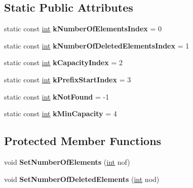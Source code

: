 \subsection*{Static Public Attributes}
\begin{DoxyCompactItemize}
\item 
\mbox{\label{classv8_1_1internal_1_1HashTableBase_aec11b4e6518d8551f973bc237740cc89}} 
static const \mbox{\hyperlink{classint}{int}} {\bfseries k\+Number\+Of\+Elements\+Index} = 0
\item 
\mbox{\label{classv8_1_1internal_1_1HashTableBase_aac8547f563526b42fd0be66a3d6cdd9e}} 
static const \mbox{\hyperlink{classint}{int}} {\bfseries k\+Number\+Of\+Deleted\+Elements\+Index} = 1
\item 
\mbox{\label{classv8_1_1internal_1_1HashTableBase_a5dbdd64713695ce2688050fe21a9fa27}} 
static const \mbox{\hyperlink{classint}{int}} {\bfseries k\+Capacity\+Index} = 2
\item 
\mbox{\label{classv8_1_1internal_1_1HashTableBase_a47b1d536b0124b61b18113aba80896bf}} 
static const \mbox{\hyperlink{classint}{int}} {\bfseries k\+Prefix\+Start\+Index} = 3
\item 
\mbox{\label{classv8_1_1internal_1_1HashTableBase_a808cd230b60a37067e5a0387e6466daf}} 
static const \mbox{\hyperlink{classint}{int}} {\bfseries k\+Not\+Found} = -\/1
\item 
\mbox{\label{classv8_1_1internal_1_1HashTableBase_a307abad55c64aae5af22b3236b4dd2da}} 
static const \mbox{\hyperlink{classint}{int}} {\bfseries k\+Min\+Capacity} = 4
\end{DoxyCompactItemize}
\subsection*{Protected Member Functions}
\begin{DoxyCompactItemize}
\item 
\mbox{\label{classv8_1_1internal_1_1HashTableBase_a73d1d12847dea6375c769aa36c54b6a8}} 
void {\bfseries Set\+Number\+Of\+Elements} (\mbox{\hyperlink{classint}{int}} nof)
\item 
\mbox{\label{classv8_1_1internal_1_1HashTableBase_a03f2719df776dfa5ad846f41f76757b1}} 
void {\bfseries Set\+Number\+Of\+Deleted\+Elements} (\mbox{\hyperlink{classint}{int}} nod)
\end{DoxyCompactItemize}
